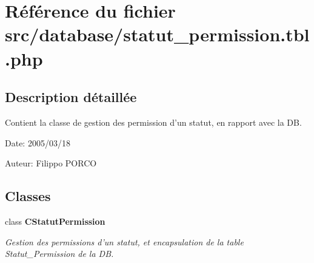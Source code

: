 \section{Référence du fichier src/database/statut\_\-permission.tbl.php}
\label{statut__permission_8tbl_8php}


\subsection{Description détaillée}
Contient la classe de gestion des permission d'un statut, en rapport avec la DB. 

\begin{Desc}
\item[Date:]2005/03/18\end{Desc}
\begin{Desc}
\item[Auteur:]Filippo PORCO \end{Desc}


\subsection*{Classes}
\begin{CompactItemize}
\item 
class {\bf CStatutPermission}
\begin{CompactList}\small\item\em Gestion des permissions d'un statut, et encapsulation de la table Statut\_\-Permission de la DB. \item\end{CompactList}\end{CompactItemize}
